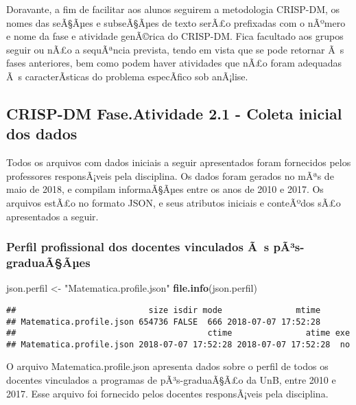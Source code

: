 \documentclass[]{article}
\newenvironment{Shaded}{\begin{snugshade}}{\end{snugshade}}
\newcommand{\KeywordTok}[1]{\textcolor[rgb]{0.13,0.29,0.53}{\textbf{#1}}}
\newcommand{\StringTok}[1]{\textcolor[rgb]{0.31,0.60,0.02}{#1}}
\newcommand{\NormalTok}[1]{#1}
\begin{document}
Doravante, a fim de facilitar aos alunos seguirem a metodologia
CRISP-DM, os nomes das seÃ§Ãµes e subseÃ§Ãµes de texto serÃ£o prefixadas
com o nÃºmero e nome da fase e atividade genÃ©rica do CRISP-DM. Fica
facultado aos grupos seguir ou nÃ£o a sequÃªncia prevista, tendo em
vista que se pode retornar Ã~s fases anteriores, bem como podem haver
atividades que nÃ£o foram adequadas Ã~s caracterÃ­sticas do problema
especÃ­fico sob anÃ¡lise.

\subsection{CRISP-DM Fase.Atividade 2.1 - Coleta inicial dos
dados}\label{crisp-dm-fase.atividade-2.1---coleta-inicial-dos-dados}

Todos os arquivos com dados iniciais a seguir apresentados foram
fornecidos pelos professores responsÃ¡veis pela disciplina. Os dados
foram gerados no mÃªs de maio de 2018, e compilam informaÃ§Ãµes entre os
anos de 2010 e 2017. Os arquivos estÃ£o no formato JSON, e seus
atributos iniciais e conteÃºdos sÃ£o apresentados a seguir.

\subsubsection{Perfil profissional dos docentes vinculados Ã~s
pÃ³s-graduaÃ§Ãµes}\label{perfil-profissional-dos-docentes-vinculados-as-pas-graduaaaes}

\begin{Shaded}
\begin{Highlighting}[]
\NormalTok{json.perfil <-}\StringTok{ "Matematica.profile.json"}
\KeywordTok{file.info}\NormalTok{(json.perfil)}
\end{Highlighting}
\end{Shaded}

\begin{verbatim}
##                           size isdir mode               mtime
## Matematica.profile.json 654736 FALSE  666 2018-07-07 17:52:28
##                                       ctime               atime exe
## Matematica.profile.json 2018-07-07 17:52:28 2018-07-07 17:52:28  no
\end{verbatim}

O arquivo Matematica.profile.json apresenta dados sobre o perfil de
todos os docentes vinculados a programas de pÃ³s-graduaÃ§Ã£o da UnB,
entre 2010 e 2017. Esse arquivo foi fornecido pelos docentes
responsÃ¡veis pela disciplina.
\end{document}
